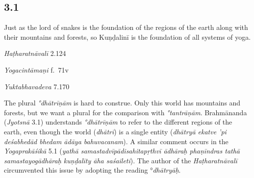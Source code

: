 

\pagestyle{HPed}
\begin{ekdosis}

\subsection*{3.1}
\begin{translation}[hp03_001]
Just as the lord of snakes is the foundation of the regions of the earth along with their mountains and forests, so Kuṇḍalinī is the foundation of all systems of yoga.
\end{translation}


\begin{testimonia}[hp03_001]
\emph{Haṭharatnāvalī} 2.124
\begin{versinnote}
\end{versinnote}

\emph{Yogacintāmaṇi} f.~71v
\begin{versinnote}
\end{versinnote}

\emph{Yuktabhavadeva} 7.170
\begin{versinnote}
\end{versinnote}
\end{testimonia}

\begin{philcomm}[hp03_001]
The plural \emph{°dhātrīṇām} is hard to construe. Only this world has mountains and forests, but we want a plural for the comparison with \emph{°tantrāṇām}. Brahmānanda (\emph{Jyotsnā} 3.1) understands \emph{°dhātrīṇām} to refer to the different regions of the earth, even though the world (\emph{dhātrī}) is a single entity (\emph{dhātryā ekatve 'pi deśabhedād bhedam ādāya bahuvacanam}). A similar comment occurs in the \emph{Yogaprakāśikā} 5.1 (\emph{yathā samastadvīpādisahitapṛthvī ādhāraḥ phaṇīndras tathā samastayogādhāraḥ kuṇḍalīty āha saśaileti}). The author of the \textit{Haṭharatnāvalī} circumvented this issue by adopting the reading °\textit{dhātryāḥ}.
\end{philcomm}


\end{ekdosis}

